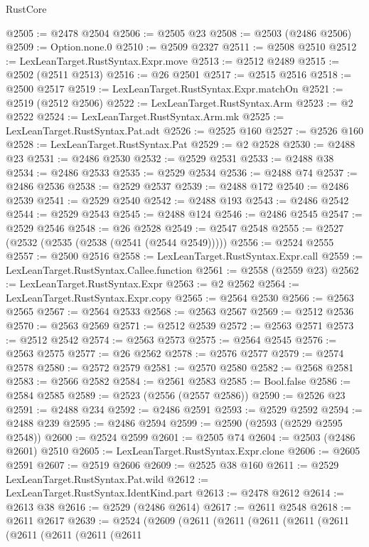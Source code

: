 \begin{lexlean}{RustCore}
\begin{coremodule}
@2505 := @2478 @2504
@2506 := @2505 @23
@2508 := @2503 (@2486 @2506)
@2509 := Option.none.{0}
@2510 := @2509 @2327
@2511 := @2508 @2510
@2512 := LexLeanTarget.RustSyntax.Expr.move
@2513 := @2512 @2489
@2515 := @2502 (@2511 @2513)
@2516 := @26 @2501
@2517 := @2515 @2516
@2518 := @2500 @2517
@2519 := LexLeanTarget.RustSyntax.Expr.matchOn
@2521 := @2519 (@2512 @2506)
@2522 := LexLeanTarget.RustSyntax.Arm
@2523 := @2 @2522
@2524 := LexLeanTarget.RustSyntax.Arm.mk
@2525 := LexLeanTarget.RustSyntax.Pat.adt
@2526 := @2525 @160
@2527 := @2526 @160
@2528 := LexLeanTarget.RustSyntax.Pat
@2529 := @2 @2528
@2530 := @2488 @23
@2531 := @2486 @2530
@2532 := @2529 @2531
@2533 := @2488 @38
@2534 := @2486 @2533
@2535 := @2529 @2534
@2536 := @2488 @74
@2537 := @2486 @2536
@2538 := @2529 @2537
@2539 := @2488 @172
@2540 := @2486 @2539
@2541 := @2529 @2540
@2542 := @2488 @193
@2543 := @2486 @2542
@2544 := @2529 @2543
@2545 := @2488 @124
@2546 := @2486 @2545
@2547 := @2529 @2546
@2548 := @26 @2528
@2549 := @2547 @2548
@2555 := @2527 (@2532 (@2535 (@2538 (@2541 (@2544 @2549)))))
@2556 := @2524 @2555
@2557 := @2500 @2516
@2558 := LexLeanTarget.RustSyntax.Expr.call
@2559 := LexLeanTarget.RustSyntax.Callee.function
@2561 := @2558 (@2559 @23)
@2562 := LexLeanTarget.RustSyntax.Expr
@2563 := @2 @2562
@2564 := LexLeanTarget.RustSyntax.Expr.copy
@2565 := @2564 @2530
@2566 := @2563 @2565
@2567 := @2564 @2533
@2568 := @2563 @2567
@2569 := @2512 @2536
@2570 := @2563 @2569
@2571 := @2512 @2539
@2572 := @2563 @2571
@2573 := @2512 @2542
@2574 := @2563 @2573
@2575 := @2564 @2545
@2576 := @2563 @2575
@2577 := @26 @2562
@2578 := @2576 @2577
@2579 := @2574 @2578
@2580 := @2572 @2579
@2581 := @2570 @2580
@2582 := @2568 @2581
@2583 := @2566 @2582
@2584 := @2561 @2583
@2585 := Bool.false
@2586 := @2584 @2585
@2589 := @2523 (@2556 (@2557 @2586))
@2590 := @2526 @23
@2591 := @2488 @234
@2592 := @2486 @2591
@2593 := @2529 @2592
@2594 := @2488 @239
@2595 := @2486 @2594
@2599 := @2590 (@2593 (@2529 @2595 @2548))
@2600 := @2524 @2599
@2601 := @2505 @74
@2604 := @2503 (@2486 @2601) @2510
@2605 := LexLeanTarget.RustSyntax.Expr.clone
@2606 := @2605 @2591
@2607 := @2519 @2606
@2609 := @2525 @38 @160
@2611 := @2529 LexLeanTarget.RustSyntax.Pat.wild
@2612 := LexLeanTarget.RustSyntax.IdentKind.part
@2613 := @2478 @2612
@2614 := @2613 @38
@2616 := @2529 (@2486 @2614)
@2617 := @2611 @2548
@2618 := @2611 @2617
@2639 := @2524
    (@2609
      (@2611
        (@2611
          (@2611
            (@2611
              (@2611
                (@2611
                  (@2611
                    (@2611
                      (@2611

\end{coremodule}
\end{lexlean}
